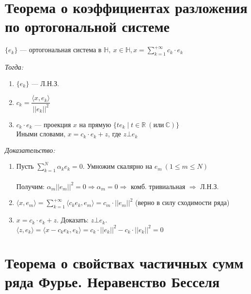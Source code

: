 \documentclass[paper=a4, fontsize=17pt]{article}
\begin{document}
\section{Теорема о коэффициентах разложения по ортогональной системе}

$\{e_k\}$ {{---}} ортогональная система в $\mathds{H},\ x \in \mathds{H}, x = \sum\limits_{k=1}^{+\infty} c_k \cdot e_k$

\emph{Тогда:}
\begin{enumerate}

	\item $\{e_k\}$ {{---}} Л.Н.З.

	\item $c_k = \dfrac{\langle x, e_k \rangle}{||e_k||^2}$

	\item $c_k \cdot e_k$ {{---}} проекция $x$ на прямую $\{te_k \mid t \in \mathbb{R}\ (\text{или}\ \mathbb{C})\}$\\
	Иными словами, $x = c_k \cdot e_k + z$, где $z \bot e_k$

\end{enumerate}

\emph{Доказательство:}

\begin{enumerate}

	\item Пусть $\sum\limits_{k=1}^{N} \alpha_k e_k = 0$. Умножим скалярно на $e_m\ (1 \leqslant m \leqslant N)$\\ \\
	Получим: $\alpha_m ||e_m||^2 = 0 \Rightarrow \alpha_m = 0 \Rightarrow$ комб. тривиальная $\Rightarrow$ Л.Н.З.

	\item $\langle x, e_m \rangle = \sum\limits_{k=1}^{+\infty} \langle c_k e_k, e_m \rangle = c_m \cdot ||e_m||^2$ (верно в силу сходимости ряда)

	\item $x = c_k \cdot e_k + z$. Доказать: $z \bot e_k$.\\
	$\langle z, e_k \rangle = \langle x - c_k e_k, e_k \rangle = c_k \cdot ||e_k||^2 - c_k\cdot ||e_k||^2 = 0$

\end{enumerate}

\section{Теорема о свойствах частичных сумм ряда Фурье. Неравенство Бесселя}
\end{document}
